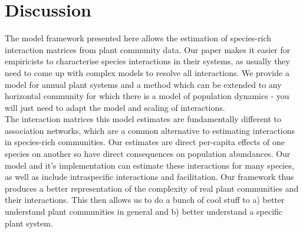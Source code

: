 \documentclass[a4,12pt]{article}
\begin{document}



\section{Discussion}
    

 
    
    The model framework presented here allows the estimation of species-rich interaction matrices from plant community data. Our paper makes it easier for empiricists to characterise species interactions in their systems, as usually they need to come up with complex models to resolve all interactions. We provide a model for annual plant systems and a method which can be extended to any horizontal community for which there is a model of population dynamics - you will just need to adapt the model and scaling of interactions. \\

    The interaction matrices this model estimates are fundamentally different to association networks, which are a common alternative to estimating interactions in species-rich communities. Our estimates are direct per-capita effects of one species on another so have direct consequences on population abundances. Our model and it's implementation can estimate these interactions for many species, as well as include intraspecific interactions and facilitation. Our framework thus produces a better representation of the complexity of real plant communities and their interactions. This then allows us to do a bunch of cool stuff to a) better understand plant communities in general and b) better understand a specific plant system.  


\end{document}
